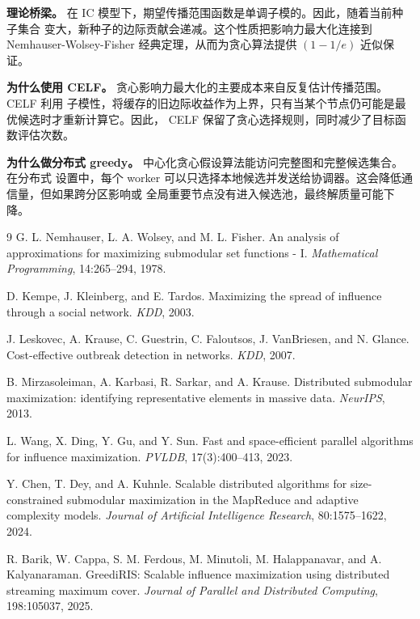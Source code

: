 \documentclass[UTF8,10pt]{ctexart}
\begin{document}
\textbf{理论桥梁。} 在 IC 模型下，期望传播范围函数是单调子模的。因此，随着当前种子集合
变大，新种子的边际贡献会递减。这个性质把影响力最大化连接到 Nemhauser-Wolsey-Fisher
经典定理，从而为贪心算法提供 $(1-1/e)$ 近似保证。

\textbf{为什么使用 CELF。} 贪心影响力最大化的主要成本来自反复估计传播范围。CELF 利用
子模性，将缓存的旧边际收益作为上界，只有当某个节点仍可能是最优候选时才重新计算它。因此，
CELF 保留了贪心选择规则，同时减少了目标函数评估次数。

\textbf{为什么做分布式 greedy。} 中心化贪心假设算法能访问完整图和完整候选集合。在分布式
设置中，每个 worker 可以只选择本地候选并发送给协调器。这会降低通信量，但如果跨分区影响或
全局重要节点没有进入候选池，最终解质量可能下降。

\begin{thebibliography}{9}
G. L. Nemhauser, L. A. Wolsey, and M. L. Fisher.
An analysis of approximations for maximizing submodular set functions - I.
\emph{Mathematical Programming}, 14:265--294, 1978.

D. Kempe, J. Kleinberg, and E. Tardos.
Maximizing the spread of influence through a social network.
\emph{KDD}, 2003.

J. Leskovec, A. Krause, C. Guestrin, C. Faloutsos, J. VanBriesen, and N. Glance.
Cost-effective outbreak detection in networks.
\emph{KDD}, 2007.

B. Mirzasoleiman, A. Karbasi, R. Sarkar, and A. Krause.
Distributed submodular maximization: identifying representative elements in
massive data.
\emph{NeurIPS}, 2013.

L. Wang, X. Ding, Y. Gu, and Y. Sun.
Fast and space-efficient parallel algorithms for influence maximization.
\emph{PVLDB}, 17(3):400--413, 2023.

Y. Chen, T. Dey, and A. Kuhnle.
Scalable distributed algorithms for size-constrained submodular maximization in
the MapReduce and adaptive complexity models.
\emph{Journal of Artificial Intelligence Research}, 80:1575--1622, 2024.

R. Barik, W. Cappa, S. M. Ferdous, M. Minutoli, M. Halappanavar, and
A. Kalyanaraman.
GreediRIS: Scalable influence maximization using distributed streaming maximum
cover.
\emph{Journal of Parallel and Distributed Computing}, 198:105037, 2025.
\end{thebibliography}
\end{document}
